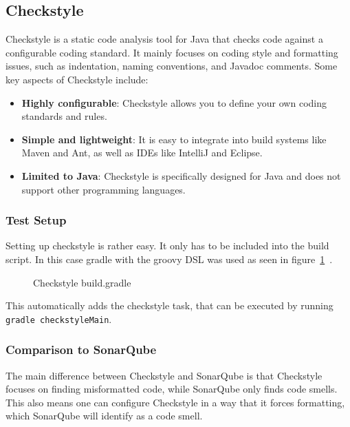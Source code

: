 \subsection{Checkstyle}\label{subsec:checkstyle}
Checkstyle is a static code analysis tool for Java that checks code against a configurable coding standard.
It mainly focuses on coding style and formatting issues, such as indentation, naming conventions, and Javadoc comments.\cite{checkstyle-docs}
Some key aspects of Checkstyle include:

\begin{itemize}
    \item\textbf{Highly configurable}: Checkstyle allows you to define your own coding standards and rules.
    \item\textbf{Simple and lightweight}: It is easy to integrate into build systems like Maven and Ant, as well as IDEs like IntelliJ and Eclipse.
    \item\textbf{Limited to Java}: Checkstyle is specifically designed for Java and does not support other programming languages.
\end{itemize}

\subsubsection{Test Setup}
Setting up checkstyle is rather easy.
It only has to be included into the build script.
In this case gradle with the groovy DSL was used as seen in figure\ \ref{fig:checkstyle-gradle}~\cite{gradle-checkstyle}.

\begin{figure}[h]
    \caption{Checkstyle build.gradle}
    
    \label{fig:checkstyle-gradle}
\end{figure}

This automatically adds the checkstyle task, that can be executed by running \texttt{gradle checkstyleMain}.

\subsubsection{Comparison to SonarQube}
The main difference between Checkstyle and SonarQube is that Checkstyle focuses on finding misformatted code, while SonarQube only finds code smells.
This also means one can configure Checkstyle in a way that it forces formatting, which SonarQube will identify as a code smell.

